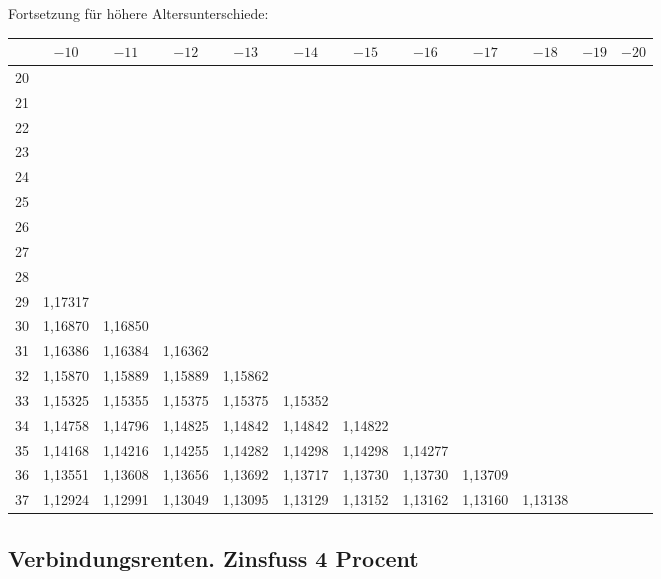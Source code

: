 \documentclass[12pt,a4paper]{article}
\begin{document}
Fortsetzung für höhere Altersunterschiede:

\begin{center}
\footnotesize
\begin{tabular}{|c|c|c|c|c|c|c|c|c|c|c|c|}
\hline
 & $-10$ & $-11$ & $-12$ & $-13$ & $-14$ & $-15$ & $-16$ & $-17$ & $-18$ & $-19$ & $-20$ \\
\hline
20 & & & & & & & & & & & \\
21 & & & & & & & & & & & \\
22 & & & & & & & & & & & \\
23 & & & & & & & & & & & \\
24 & & & & & & & & & & & \\
25 & & & & & & & & & & & \\
26 & & & & & & & & & & & \\
27 & & & & & & & & & & & \\
28 & & & & & & & & & & & \\
29 & 1,17317 & & & & & & & & & & \\
30 & 1,16870 & 1,16850 & & & & & & & & & \\
31 & 1,16386 & 1,16384 & 1,16362 & & & & & & & & \\
32 & 1,15870 & 1,15889 & 1,15889 & 1,15862 & & & & & & & \\
33 & 1,15325 & 1,15355 & 1,15375 & 1,15375 & 1,15352 & & & & & & \\
34 & 1,14758 & 1,14796 & 1,14825 & 1,14842 & 1,14842 & 1,14822 & & & & & \\
35 & 1,14168 & 1,14216 & 1,14255 & 1,14282 & 1,14298 & 1,14298 & 1,14277 & & & & \\
36 & 1,13551 & 1,13608 & 1,13656 & 1,13692 & 1,13717 & 1,13730 & 1,13730 & 1,13709 & & & \\
37 & 1,12924 & 1,12991 & 1,13049 & 1,13095 & 1,13129 & 1,13152 & 1,13162 & 1,13160 & 1,13138 & & \\
\hline
\end{tabular}
\end{center}

\subsection*{Verbindungsrenten. Zinsfuss 4 Procent}
\end{document}
